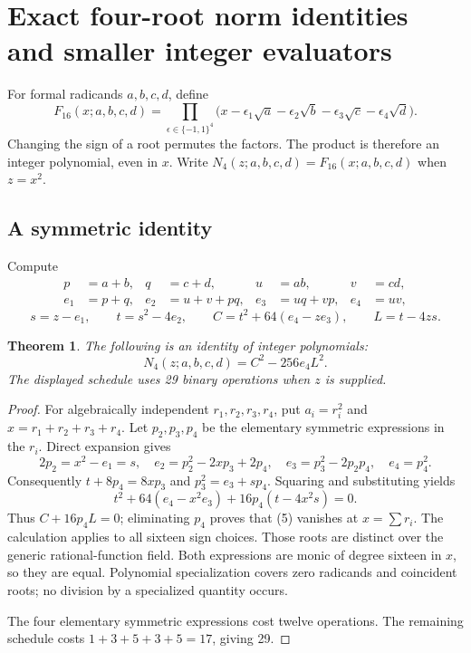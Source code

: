 \documentclass[11pt]{article}
\newtheorem{theorem}{Theorem}[section]
\theoremstyle{remark}
\begin{document}
\section{Exact four-root norm identities and smaller integer evaluators}
\label{sec:norm}

For formal radicands $a,b,c,d$, define
\[
F_{16}(x;a,b,c,d)=
\prod_{\epsilon\in\{-1,1\}^4}
\bigl(x-\epsilon_1\sqrt a-\epsilon_2\sqrt b
        -\epsilon_3\sqrt c-\epsilon_4\sqrt d\bigr).
\tag{3}
\]
Changing the sign of a root permutes the factors. The product is therefore
an integer polynomial, even in $x$. Write
$N_4(z;a,b,c,d)=F_{16}(x;a,b,c,d)$ when $z=x^2$.

\subsection{A symmetric identity}

Compute
\[
\begin{aligned}
p&=a+b,&q&=c+d,&u&=ab,&v&=cd,\\
e_1&=p+q,&e_2&=u+v+pq,&e_3&=uq+vp,&e_4&=uv,
\end{aligned}
\]
\[
s=z-e_1,\qquad t=s^2-4e_2,\qquad
C=t^2+64(e_4-ze_3),\qquad L=t-4zs.
\tag{4}
\]

\begin{theorem}
The following is an identity of integer polynomials:
\[
\boxed{N_4(z;a,b,c,d)=C^2-256e_4L^2.}
\tag{5}
\]
The displayed schedule uses 29 binary operations when $z$ is supplied.
\end{theorem}

\begin{proof}
For algebraically independent $r_1,r_2,r_3,r_4$, put $a_i=r_i^2$ and
$x=r_1+r_2+r_3+r_4$. Let $p_2,p_3,p_4$ be the elementary symmetric
expressions in the $r_i$. Direct expansion gives
\[
2p_2=x^2-e_1=s,\quad e_2=p_2^2-2xp_3+2p_4,\quad
e_3=p_3^2-2p_2p_4,\quad e_4=p_4^2.
\]
Consequently $t+8p_4=8xp_3$ and $p_3^2=e_3+sp_4$. Squaring and
substituting yields
\[
t^2+64(e_4-x^2e_3)+16p_4(t-4x^2s)=0.
\]
Thus $C+16p_4L=0$; eliminating $p_4$ proves that (5) vanishes at
$x=\sum r_i$. The calculation applies to all sixteen sign choices.
Those roots are distinct over the generic rational-function field.
Both expressions are monic of degree sixteen in $x$, so they are equal.
Polynomial specialization covers zero radicands and coincident roots;
no division by a specialized quantity occurs.

The four elementary symmetric expressions cost twelve operations.
The remaining schedule costs $1+3+5+3+5=17$, giving 29.
\end{proof}
\end{document}
